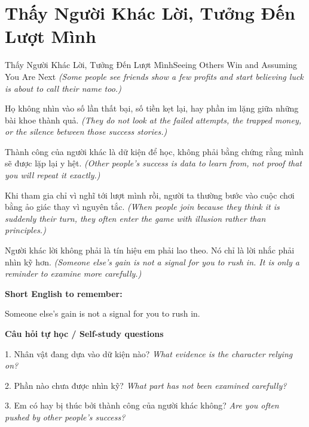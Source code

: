 \section{Thấy Người Khác Lời, Tưởng Đến Lượt Mình}
\begin{truyen}{Thấy Người Khác Lời, Tưởng Đến Lượt Mình}{Seeing Others Win and Assuming You Are Next}
\textit{(Some people see friends show a few profits and start believing luck is about to call their name too.)}

Họ không nhìn vào số lần thất bại, số tiền kẹt lại, hay phần im lặng giữa những bài khoe thành quả.
\textit{(They do not look at the failed attempts, the trapped money, or the silence between those success stories.)}

Thành công của người khác là dữ kiện để học, không phải bằng chứng rằng mình sẽ được lặp lại y hệt.
\textit{(Other people's success is data to learn from, not proof that you will repeat it exactly.)}

Khi tham gia chỉ vì nghĩ tới lượt mình rồi, người ta thường bước vào cuộc chơi bằng ảo giác thay vì nguyên tắc.
\textit{(When people join because they think it is suddenly their turn, they often enter the game with illusion rather than principles.)}

\end{truyen}

\begin{baihoc}
Người khác lời không phải là tín hiệu em phải lao theo. Nó chỉ là lời nhắc phải nhìn kỹ hơn.
\textit{(Someone else's gain is not a signal for you to rush in. It is only a reminder to examine more carefully.)}
\end{baihoc}

\begin{ghinhoanh}
\textbf{Short English to remember:}

Someone else's gain is not a signal for you to rush in.

\end{ghinhoanh}

\begin{tuhocnhanh}
\textbf{Câu hỏi tự học / Self-study questions}

1. Nhân vật đang dựa vào dữ kiện nào? \textit{What evidence is the character relying on?}

2. Phần nào chưa được nhìn kỹ? \textit{What part has not been examined carefully?}

3. Em có hay bị thúc bởi thành công của người khác không? \textit{Are you often pushed by other people's success?}
\end{tuhocnhanh}
\ngancach

